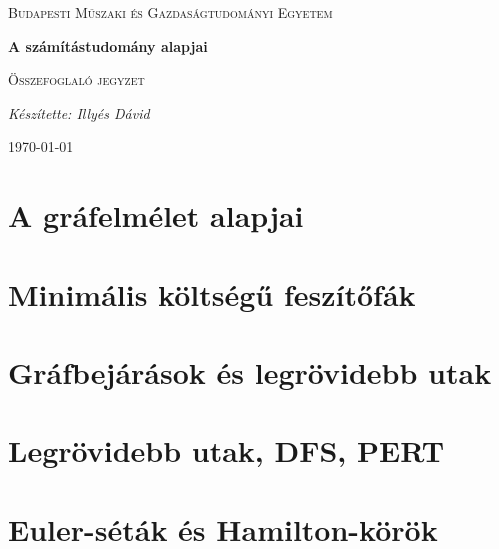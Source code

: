 \documentclass[12pt]{article}
\begin{document}
\begin{titlepage}
	\centering \vfill
	{\textsc{Budapesti Műszaki és Gazdaságtudományi Egyetem} \par} \vspace{7cm}
	{\huge\bfseries A számítástudomány alapjai\par} \vspace{0.5cm}
	{\large \textsc{Összefoglaló jegyzet}\par} \vspace{1.5cm}
	{\Large\itshape Készítette: Illyés Dávid\par} \vfill

	\noindent{}
	
	\vfill {\large \today\par}
\end{titlepage} 
\tableofcontents
{}

	\section{A gráfelmélet alapjai}
		
		
	 
	\section{Minimális költségű feszítőfák}

		

	\section{Gráfbejárások és legrövidebb utak}
		
		
		
	\section{Legrövidebb utak, DFS, PERT}

		
		
	\section{Euler-séták és Hamilton-körök}
\end{document}

